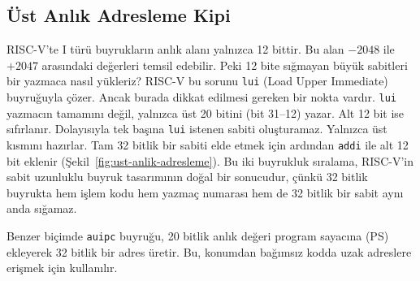 \subsection{Üst Anlık Adresleme Kipi}
RISC-V'te I türü buyrukların anlık alanı yalnızca 12 bittir. Bu alan $-2048$ ile $+2047$ arasındaki değerleri temsil edebilir. Peki 12 bite sığmayan büyük sabitleri bir yazmaca nasıl yükleriz? RISC-V bu sorunu \texttt{lui} (Load Upper Immediate) buyruğuyla çözer. Ancak burada dikkat edilmesi gereken bir nokta vardır. \texttt{lui} yazmacın tamamını değil, yalnızca üst 20 bitini (bit 31--12) yazar. Alt 12 bit ise sıfırlanır. Dolayısıyla tek başına \texttt{lui} istenen sabiti oluşturamaz. Yalnızca üst kısmını hazırlar. Tam 32 bitlik bir sabiti elde etmek için ardından \texttt{addi} ile alt 12 bit eklenir (Şekil~\ref{fig:ust-anlik-adresleme}). Bu iki buyrukluk sıralama, RISC-V'in sabit uzunluklu buyruk tasarımının doğal bir sonucudur, çünkü 32 bitlik buyrukta hem işlem kodu hem yazmaç numarası hem de 32 bitlik bir sabit aynı anda sığamaz.

Benzer biçimde \texttt{auipc} buyruğu, 20 bitlik anlık değeri program sayacına (PS) ekleyerek 32 bitlik bir adres üretir. Bu, konumdan bağımsız kodda uzak adreslere erişmek için kullanılır.


